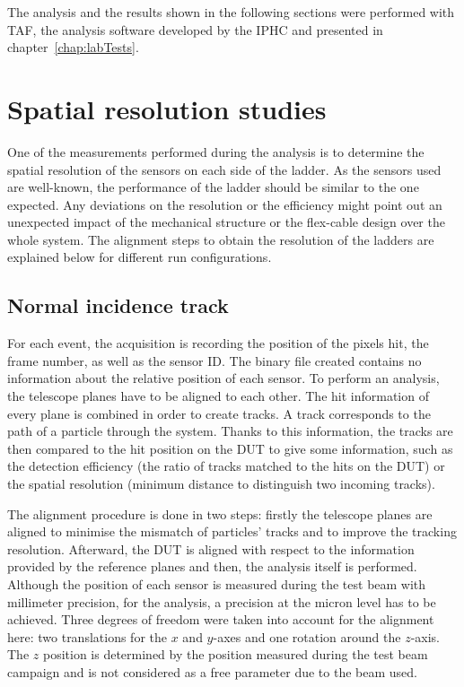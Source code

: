     The analysis and the results shown in the following sections were performed with \gls{TAF}, the analysis software developed by the \gls{IPHC} and presented in chapter~\ref{chap:labTests}.

  \section{Spatial resolution studies}
   
    One of the measurements performed during the analysis is to determine the spatial resolution of the sensors on each side of the ladder.
    As the sensors used are well-known, the performance of the ladder should be similar to the one expected.
    Any deviations on the resolution or the efficiency might point out an unexpected impact of the mechanical structure or the flex-cable design over the whole system.
    The alignment steps to obtain the resolution of the ladders are explained below for different run configurations. 

    \subsection{Normal incidence track}
     
    For each event, the acquisition is recording the position of the pixels hit, the frame number, as well as the sensor ID.
    The binary file created contains no information about the relative position of each sensor.
    To perform an analysis, the telescope planes have to be aligned to each other.
    The hit information of every plane is combined in order to create tracks. 
    A track corresponds to the path of a particle through the system.
    Thanks to this information, the tracks are then compared to the hit position on the \gls{DUT} to give some information, such as the detection efficiency (the ratio of tracks matched to the hits on the \gls{DUT}) or the spatial resolution (minimum distance to distinguish two incoming tracks).

    The alignment procedure is done in two steps: firstly the telescope planes are aligned to minimise the mismatch of particles' tracks and to improve the tracking resolution.
    Afterward, the \gls{DUT} is aligned with respect to the information provided by the reference planes and then, the analysis itself is performed.
    Although the position of each sensor is measured during the test beam with millimeter precision, for the analysis, a precision at the micron level has to be achieved.
    Three degrees of freedom were taken into account for the alignment here: two translations for the $x$ and $y$-axes and one rotation around the $z$-axis.
    The $z$ position is determined by the position measured during the test beam campaign and is not considered as a free parameter due to the beam used.

